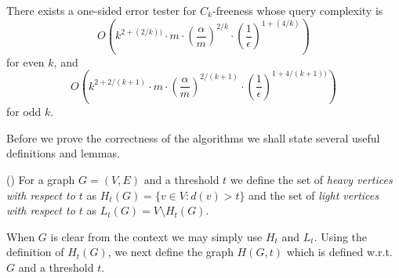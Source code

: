 

\begin{corollary}\label{cor:Ck-ub}
There exists a one-sided error tester for $C_k$-freeness whose query complexity is
$$O\left(k^{2+(2/k))} \cdot m \cdot \left(\frac{\alpha}{m }\right)^{2/k} \cdot \left(\frac{1}{\epsilon}\right)^{1+(4/k)}\right)$$
for even $k$, and
$$O\left(k^{2+2/(k+1)} \cdot m \cdot \left(\frac{\alpha}{m }\right)^{2/(k+1)} \cdot \left(\frac{1}{\epsilon}\right)^{1+4/(k+1))}\right)$$
for odd $k$.
\end{corollary}

\iffalse
Before we prove the correctness of the algorithms we shall state several useful definitions and lemmas.


\begin{definition}(\cite{})
For a graph $G = (V, E)$ and a threshold $t$ we define the set of {\em heavy vertices with respect to $t$} as $H_t(G) = \{v\in V: d(v) > t\}$
and the set of {\em light vertices with respect to $t$} as $L_t(G) = V \setminus H_t(G)$.
\end{definition}
When $G$ is clear from the context we may simply use $H_t$ and $L_t$.
Using the definition of $H_t(G)$, we next define the graph $H(G, t)$ which is defined w.r.t. $G$ and a threshold $t$.

